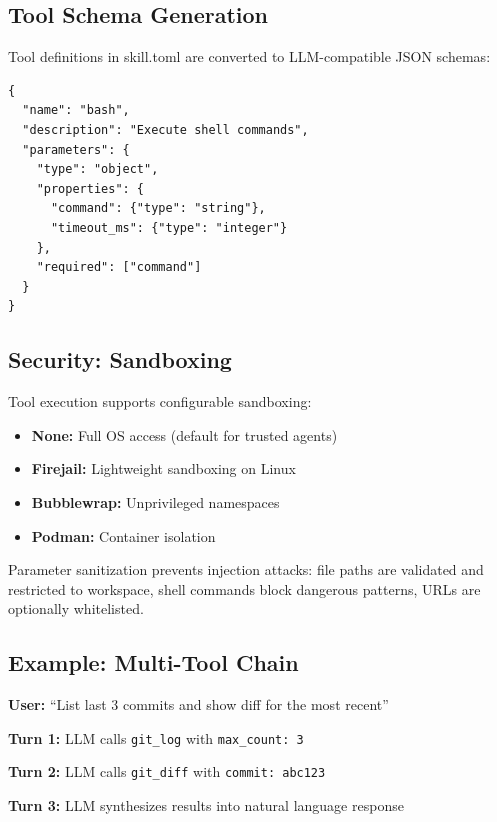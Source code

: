 \documentclass{article}
\begin{document}
\subsection{Tool Schema Generation}

Tool definitions in skill.toml are converted to LLM-compatible JSON schemas:

\begin{lstlisting}[style=jsoncode]
{
  "name": "bash",
  "description": "Execute shell commands",
  "parameters": {
    "type": "object",
    "properties": {
      "command": {"type": "string"},
      "timeout_ms": {"type": "integer"}
    },
    "required": ["command"]
  }
}
\end{lstlisting}

\subsection{Security: Sandboxing}

Tool execution supports configurable sandboxing:

\begin{itemize}[leftmargin=*]
    \item \textbf{None:} Full OS access (default for trusted agents)
    \item \textbf{Firejail:} Lightweight sandboxing on Linux
    \item \textbf{Bubblewrap:} Unprivileged namespaces
    \item \textbf{Podman:} Container isolation
\end{itemize}

Parameter sanitization prevents injection attacks: file paths are validated and restricted to workspace, shell commands block dangerous patterns, URLs are optionally whitelisted.

\subsection{Example: Multi-Tool Chain}

\textbf{User:} ``List last 3 commits and show diff for the most recent''

\textbf{Turn 1:} LLM calls \texttt{git\_log} with \texttt{max\_count: 3}

\textbf{Turn 2:} LLM calls \texttt{git\_diff} with \texttt{commit: abc123}

\textbf{Turn 3:} LLM synthesizes results into natural language response


\end{document}
